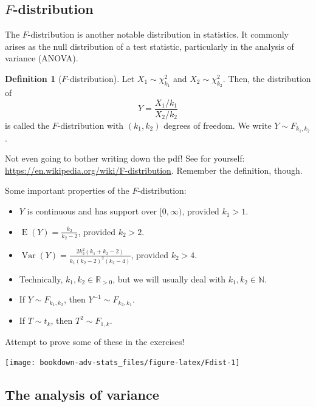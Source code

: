 \documentclass[
]{book}
\providecommand{\tightlist}{%
  \setlength{\itemsep}{0pt}\setlength{\parskip}{0pt}}
\DeclareMathOperator{\E}{E}
\DeclareMathOperator{\Var}{Var}
\newcommand{\bbR}{\mathbb{R}}
\newcommand{\bbN}{\mathbb{N}}
\theoremstyle{definition}
\newtheorem{definition}{Definition}[chapter]
\theoremstyle{definition}
\theoremstyle{definition}
\theoremstyle{definition}
\theoremstyle{remark}
\begin{document}
\hypertarget{f-distribution}{%
\subsection{\texorpdfstring{\(F\)-distribution}{F-distribution}}\label{f-distribution}}

The \(F\)-distribution is another notable distribution in
statistics. It commonly arises as the null distribution of a test
statistic, particularly in the analysis of variance (ANOVA).

\begin{definition}[$F$-distribution]
Let \(X_1 \sim \chi^2_{k_1}\) and \(X_2 \sim \chi^2_{k_2}\).
Then, the distribution of \[Y = \frac{X_1/k_1}{X_2/k_2}\] is called the \(F\)-distribution with \((k_1,k_2)\) degrees of freedom.
We write \(Y\sim F_{k_1,k_2}\).
\end{definition}

Not even going to bother writing down the pdf! See for yourself:
\url{https://en.wikipedia.org/wiki/F-distribution}.
Remember the definition, though.

Some important properties of the \(F\)-distribution:

\begin{itemize}
\tightlist
\item
  \(Y\) is continuous and has support over \([0,\infty)\), provided
  \(k_1>1\).
\item
  \(\E(Y)=\frac{k_2}{k_2 - 2}\), provided \(k_2>2\).
\item
  \(\Var(Y) = \frac{2k_2^2(k_1+k_2-2)}{k_1(k_2-2)^2(k_2-4)}\), provided
  \(k_2>4\).
\item
  Technically, \(k_1,k_2\in\bbR_{>0}\), but we will usually deal with
  \(k_1,k_2\in\bbN\).
\item
  If \(Y\sim F_{k_1,k_2}\), then \(Y^{-1}\sim F_{k_2,k_1}\).
\item
  If \(T\sim t_{k}\), then \(T^2 \sim F_{1,k}\).
\end{itemize}

Attempt to prove some of these in the exercises!

\begin{center}\texttt{[image: bookdown-adv-stats\_files/figure-latex/Fdist-1]} \end{center}

\hypertarget{the-analysis-of-variance}{%
\subsection{The analysis of variance}\label{the-analysis-of-variance}}
\end{document}
